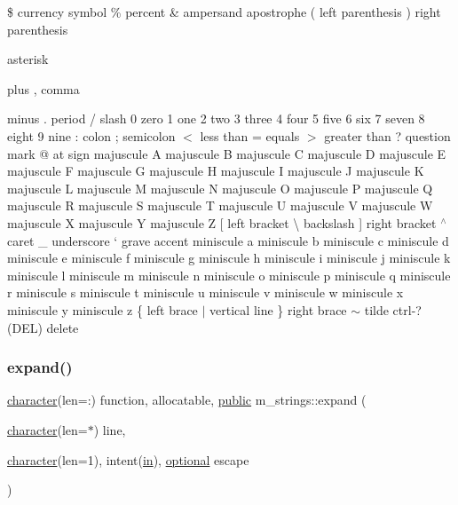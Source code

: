 \$ currency symbol \% percent \& ampersand \textquotesingle{} apostrophe ( left parenthesis ) right parenthesis
\begin{DoxyItemize}
\item asterisk
\item plus , comma
\item minus . period / slash 0 zero 1 one 2 two 3 three 4 four 5 five 6 six 7 seven 8 eight 9 nine \+: colon ; semicolon $<$ less than = equals $>$ greater than ? question mark @ at sign majuscule A majuscule B majuscule C majuscule D majuscule E majuscule F majuscule G majuscule H majuscule I majuscule J majuscule K majuscule L majuscule M majuscule N majuscule O majuscule P majuscule Q majuscule R majuscule S majuscule T majuscule U majuscule V majuscule W majuscule X majuscule Y majuscule Z \mbox{[} left bracket \textbackslash{} backslash \mbox{]} right bracket $^\wedge$ caret \+\_\+ underscore ` grave accent miniscule a miniscule b miniscule c miniscule d miniscule e miniscule f miniscule g miniscule h miniscule i miniscule j miniscule k miniscule l miniscule m miniscule n miniscule o miniscule p miniscule q miniscule r miniscule s miniscule t miniscule u miniscule v miniscule w miniscule x miniscule y miniscule z \{ left brace $\vert$ vertical line \} right brace $\sim$ tilde ctrl-\/? (D\+EL) delete 
\end{DoxyItemize}\mbox{\label{namespacem__strings_a33b248107c1521272b55cda5c4077378}} 
\subsubsection{\texorpdfstring{expand()}{expand()}}
{\footnotesize\ttfamily \hyperlink{option__stopwatch_83_8txt_abd4b21fbbd175834027b5224bfe97e66}{character}(len=\+:) function, allocatable, \hyperlink{M__stopwatch_83_8txt_a2f74811300c361e53b430611a7d1769f}{public} m\+\_\+strings\+::expand (\begin{DoxyParamCaption}\item[{\hyperlink{option__stopwatch_83_8txt_abd4b21fbbd175834027b5224bfe97e66}{character}(len=$\ast$)}]{line,  }\item[{\hyperlink{option__stopwatch_83_8txt_abd4b21fbbd175834027b5224bfe97e66}{character}(len=1), intent(\hyperlink{M__journal_83_8txt_afce72651d1eed785a2132bee863b2f38}{in}), \hyperlink{option__stopwatch_83_8txt_aa4ece75e7acf58a4843f70fe18c3ade5}{optional}}]{escape }\end{DoxyParamCaption})}



